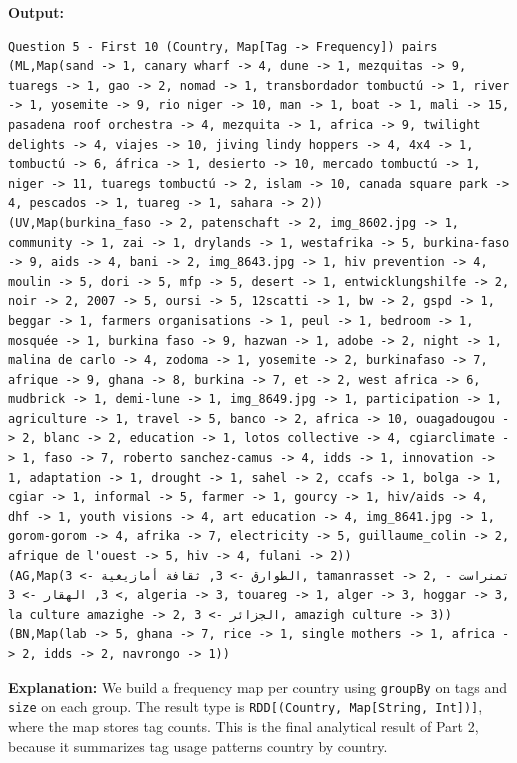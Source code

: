 \documentclass[11pt]{article}
\begin{document}
\textbf{Output:}
\begin{lstlisting}
Question 5 - First 10 (Country, Map[Tag -> Frequency]) pairs
(ML,Map(sand -> 1, canary wharf -> 4, dune -> 1, mezquitas -> 9, tuaregs -> 1, gao -> 2, nomad -> 1, transbordador tombuctú -> 1, river -> 1, yosemite -> 9, rio niger -> 10, man -> 1, boat -> 1, mali -> 15, pasadena roof orchestra -> 4, mezquita -> 1, africa -> 9, twilight delights -> 4, viajes -> 10, jiving lindy hoppers -> 4, 4x4 -> 1, tombuctú -> 6, áfrica -> 1, desierto -> 10, mercado tombuctú -> 1, niger -> 11, tuaregs tombuctú -> 2, islam -> 10, canada square park -> 4, pescados -> 1, tuareg -> 1, sahara -> 2))
(UV,Map(burkina_faso -> 2, patenschaft -> 2, img_8602.jpg -> 1, community -> 1, zai -> 1, drylands -> 1, westafrika -> 5, burkina-faso -> 9, aids -> 4, bani -> 2, img_8643.jpg -> 1, hiv prevention -> 4, moulin -> 5, dori -> 5, mfp -> 5, desert -> 1, entwicklungshilfe -> 2, noir -> 2, 2007 -> 5, oursi -> 5, 12scatti -> 1, bw -> 2, gspd -> 1, beggar -> 1, farmers organisations -> 1, peul -> 1, bedroom -> 1, mosquée -> 1, burkina faso -> 9, hazwan -> 1, adobe -> 2, night -> 1, malina de carlo -> 4, zodoma -> 1, yosemite -> 2, burkinafaso -> 7, afrique -> 9, ghana -> 8, burkina -> 7, et -> 2, west africa -> 6, mudbrick -> 1, demi-lune -> 1, img_8649.jpg -> 1, participation -> 1, agriculture -> 1, travel -> 5, banco -> 2, africa -> 10, ouagadougou -> 2, blanc -> 2, education -> 1, lotos collective -> 4, cgiarclimate -> 1, faso -> 7, roberto sanchez-camus -> 4, idds -> 1, innovation -> 1, adaptation -> 1, drought -> 1, sahel -> 2, ccafs -> 1, bolga -> 1, cgiar -> 1, informal -> 5, farmer -> 1, gourcy -> 1, hiv/aids -> 4, dhf -> 1, youth visions -> 4, art education -> 4, img_8641.jpg -> 1, gorom-gorom -> 4, afrika -> 7, electricity -> 5, guillaume_colin -> 2, afrique de l'ouest -> 5, hiv -> 4, fulani -> 2))
(AG,Map(الطوارق -> 3, ثقافة أمازيغية -> 3, tamanrasset -> 2, تمنراست -> 3, الهقار -> 3, algeria -> 3, touareg -> 1, alger -> 3, hoggar -> 3, la culture amazighe -> 2, الجزائر -> 3, amazigh culture -> 3))
(BN,Map(lab -> 5, ghana -> 7, rice -> 1, single mothers -> 1, africa -> 2, idds -> 2, navrongo -> 1))
\end{lstlisting}

\textbf{Explanation:} We build a frequency map per country using \texttt{groupBy} on tags and \texttt{size} on each group. The result type is \texttt{RDD[(Country, Map[String, Int])]}, where the map stores tag counts. This is the final analytical result of Part 2, because it summarizes tag usage patterns country by country.
\end{document}
